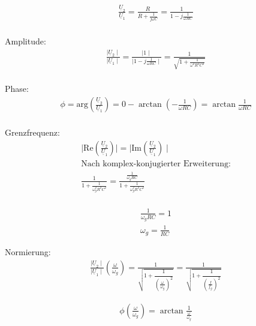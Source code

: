 \documentclass[a4paper, 12pt]{article}
\begin{document}
    \begin{gather*}
      \frac{\underline{U}_2}{\underline{U}_1} = \frac{R}{R +\frac{1}{j \omega C}} = \frac{1}{1 - j \frac{1}{\omega R C}}\\
    \end{gather*}

    Amplitude:
      \begin{gather*}
        \frac{\mid \underline{U}_2 \mid}{\mid \underline{U}_1 \mid} = \frac{\mid 1 \mid}{\mid 1 - j \frac{1}{\omega R C} \mid} = \frac{1}{\sqrt{1 + \frac{1}{\omega^2 R^2 C^2}}}\\
      \end{gather*}

    Phase:
      \begin{gather*}
        \phi = \text{arg} \left( \frac{ \underline{U}_2 }{ \underline{U}_1 } \right) = 0 - \arctan{\left(-\frac{1}{\omega R C}\right)} = \arctan{ \frac{1}{\omega R C}}\\
      \end{gather*}

    Grenzfrequenz:
      \begin{gather*}
        \mid \text{Re}\left( \frac{ \underline{U}_2 }{ \underline{U}_1 } \right) \mid = \mid \text{Im}\left( \frac{ \underline{U}_2 }{ \underline{U}_1 } \right) \mid\\
        \text{Nach komplex-konjugierter Erweiterung:}\\
        \frac{1}{1 + \frac{1}{\omega_g^2 R^2 C^2}} = \frac{\frac{1}{\omega_g R C}}{1 + \frac{1}{\omega_g^2 R^2 C^2}}\\
      \end{gather*}

      \begin{gather*}
        \frac{1}{\omega_g R C} = 1\\
        \omega_g = \frac{1}{R C}
      \end{gather*}

    Normierung:
        \begin{gather*}
          \frac{\mid \underline{U}_2 \mid}{\mid \underline{U}_1 \mid} \left( \frac{\omega}{\omega_g} \right) = \frac{1}{\sqrt{1+\dfrac{1}{\left( \frac{\omega}{\omega_g} \right)^2} }} = \frac{1}{\sqrt{1+\dfrac{1}{\left(\frac{f}{f_g} \right)^2 }}}
        \end{gather*}

        \begin{gather*}
          \phi \left( \frac{\omega}{\omega_g} \right) = \arctan{ \frac{1}{\frac{\omega}{\omega_g}} }
        \end{gather*} \\
\end{document}
